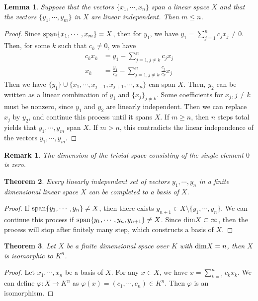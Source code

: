 \documentclass[11pt]{book}
\newtheorem{theorem}{Theorem}[section]
\newtheorem{lemma}[theorem]{Lemma}
\newtheorem{remark}{Remark}[section]
\theoremstyle{definition}
\numberwithin{equation}{subsection}
\begin{document}
\begin{lemma}
Suppose that the vectors $\{x_1,\cdots,x_n\}$ span a linear space $X$ and that
the vectors $\{y_1,\cdots,y_m\}$ in $X$ are linear independent. Then $m \leq n$.
\end{lemma}
\begin{proof}
Since ${\rm span}\{x_1,\cdots,x_m\} = X$, then for $y_1$, we have $y_1 = \sum^n_{j=1}c_j x_j \neq 0$. Then, for some $k$ such that $c_k\neq 0$, we have
\begin{align*}
    c_k x_k & = y_1 - \sum^n_{j=1, j\neq k} c_j x_j \\
    x_k & = \frac{y_1}{c_k} - \sum^n_{j=1, j\neq k} \frac{c_j}{c_k} x_j
\end{align*}
Then we have $\{y_1\}\cup\{x_1,\cdots,x_{j-1},x_{j+1},\cdots, x_n\}$ can span $X$. Then, $y_2$ can be written as a linear combination of $y_1$ and $\{x_j\}_{j\neq k}$. Some coefficients for $x_j, j\neq k$ must be nonzero, since $y_1$ and $y_2$ are linearly independent. Then we can replace $x_j$ by $y_2$, and continue this process until it spans $X$. If $m \geq n$, then $n$ steps total yields that $y_1,\cdots,y_m$ span $X$. If $m > n$, this contradicts the linear independence of the vectors $y_1,\cdots,y_m$.
\end{proof}

\begin{remark}
The dimension of the trivial space consisting of the single element $0$ is zero.
\end{remark}

\medskip

\begin{theorem}
Every linearly independent set of vectors $y_1,\cdots,y_n$ in a finite dimensional linear space $X$ can be completed to a basis of $X$.
\end{theorem}
\begin{proof}
If ${\rm span}\{y_1,\cdots,y_n\} \neq X$, then there exists $y_{n+1}\in X \setminus \{y_1,\cdots,y_n\}$. We can continue this process if ${\rm span}\{y_1,\cdots,y_n, y_{n+1}\}\neq X$. Since ${\rm dim}X \subset \infty$, then the process will stop after finitely many step, which  constructs a basis of $X$.
\end{proof}

\medskip

\begin{theorem}
Let $X$ be a finite dimensional space over $K$ with ${\rm dim}X = n$, then $X$ is isomorphic to $K^n$.
\end{theorem}
\begin{proof}
Let $x_1, \cdots, x_n$ be a basis of $X$. For any $x\in X$, we have $x = \sum^n_{k=1}c_k x_k$. We can define $\varphi: X\to K^n$ as $\varphi(x) = (c_1, \cdots, c_n) \in K^n$. Then $\varphi$ is an isomorphism.
\end{proof}
\end{document}
